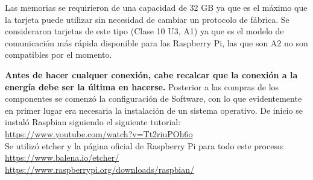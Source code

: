 \documentclass[twocolumn, letterpaper,aps,pra,10pt]{revtex4-1}
\begin{document}
Las memorias se requirieron de una capacidad de 32 GB ya que es el máximo que la tarjeta puede utilizar sin necesidad de cambiar un protocolo de fábrica. Se consideraron tarjetas de este tipo (Clase 10 U3, A1) ya que es el modelo de comunicación más rápida disponible para las Raspberry Pi, las que son A2 no son compatibles por el momento. 

\textbf{Antes de hacer cualquer conexión, cabe recalcar que la conexión a la energía debe ser la última en hacerse.}
Posterior a las compras de los componentes se comenzó la configuración de Software, con lo que evidentemente en primer lugar era necesaria la instalación de un sistema operativo. De inicio se instaló Raspbian siguiendo el siguiente tutorial: \\
\url{https://www.youtube.com/watch?v=Tt2riuPOh6o}
\\

Se utilizó etcher y la página oficial de Raspberry Pi para todo este proceso:
\\
\url{https://www.balena.io/etcher/}\\
\url{https://www.raspberrypi.org/downloads/raspbian/}
\\



\begin{thebibliography}{99}
\end{thebibliography}
\end{document}
